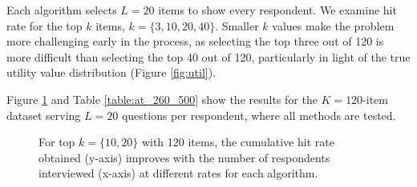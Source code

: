 \documentclass[nonblindrev]{informs3}
\newcommand{\eric}[1]{\textcolor{red}{\textbf{(eric)} #1}}
\newcommand{\ts}{\textbf{TS} }
\newcommand{\tsthres}{\textbf{TS-thres} }
\newcommand{\edtsthres}{$\epsilon$-$\delta$-\textbf{TS-thres} }
\newcommand{\numperset}{L}
\begin{document}
Each algorithm selects $\numperset=20$ items to show every respondent. We examine hit rate for the top $k$ items, $k = \{3,10,20,40\}$. Smaller $k$ values make the problem more challenging early in the process, as selecting the top three out of 120 is more difficult than selecting the top 40 out of 120, particularly in light of the true utility value distribution (Figure \ref{fig:util}).  


Figure \ref{fig:K120_L20_k3hit_k10hit} and Table \ref{table:at_260_500} show the results for the $K=120$-item dataset serving $\numperset=20$ questions per respondent, where all methods are tested.


\begin{figure}%
    \caption{For top $k=\{10,20\}$ with 120 items, the cumulative hit rate obtained (y-axis) improves with the number of respondents interviewed (x-axis) at different rates for each algorithm.}%
    \label{fig:K120_L20_k3hit_k10hit}%
 	\begin{center}
    \qquad
	\end{center}
\end{figure}
\end{document}
